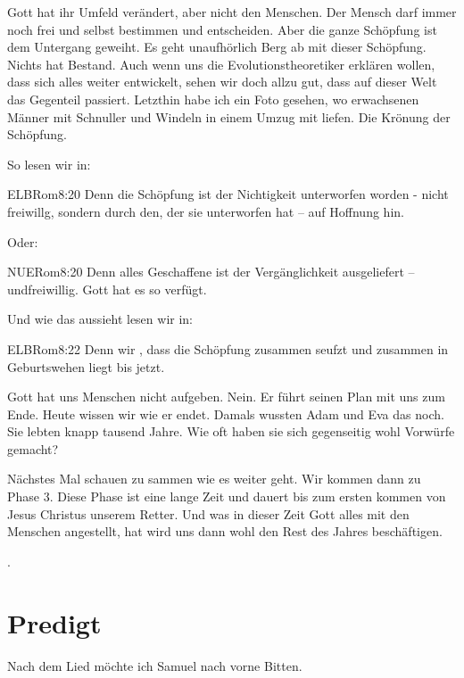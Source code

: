 \documentclass{../../inc/mybib}
\begin{document}
\begin{spacing}{1.5}
\begin{block}[ABER]
        Gott hat ihr Umfeld verändert, aber nicht den Menschen. Der Mensch darf immer noch frei und selbst bestimmen und entscheiden.  Aber die ganze Schöpfung ist dem Untergang geweiht. Es geht unaufhörlich Berg ab mit dieser Schöpfung. Nichts hat Bestand. Auch wenn uns die Evolutionstheoretiker erklären wollen, dass sich alles weiter entwickelt, sehen wir doch allzu gut, dass auf dieser Welt das Gegenteil passiert. Letzthin habe ich ein Foto gesehen, wo erwachsenen Männer mit Schnuller und Windeln in einem Umzug mit liefen. Die Krönung der Schöpfung.

       So lesen wir in:
        \begin{bibelbox}{ELB}{Rom}{8:20}
            Denn die Schöpfung ist der Nichtigkeit unterworfen worden - nicht freiwillg, sondern durch den, der sie unterworfen hat -- auf Hoffnung hin.
        \end{bibelbox}
        Oder:
        \begin{bibelbox}{NUE}{Rom}{8:20}
            Denn alles Geschaffene ist der Vergänglichkeit ausgeliefert -- undfreiwillig. Gott hat es so verfügt.
        \end{bibelbox}
        Und wie das aussieht lesen wir in:
        \begin{bibelbox}{ELB}{Rom}{8:22}
            Denn wir , dass die  Schöpfung zusammen seufzt und zusammen in Geburtswehen liegt bis jetzt.
        \end{bibelbox}
    \end{block}
    \begin{block}
        Gott hat uns Menschen nicht aufgeben. Nein. Er führt seinen Plan mit uns zum Ende. Heute wissen wir wie er endet. Damals wussten Adam und Eva das noch. Sie lebten knapp tausend Jahre. Wie oft haben sie sich gegenseitig wohl Vorwürfe gemacht?
    \end{block}
    \begin{block}
        Nächstes Mal schauen zu sammen wie es weiter geht. Wir kommen dann zu Phase 3. Diese Phase ist eine lange Zeit und dauert bis zum ersten kommen von Jesus Christus unserem Retter. Und was in dieser Zeit Gott alles mit den Menschen angestellt, hat wird uns dann wohl den Rest des Jahres beschäftigen.
    \end{block}    
    
\end{spacing}
.

\section{Predigt}
Nach dem Lied möchte ich Samuel nach vorne Bitten.
\end{document}
